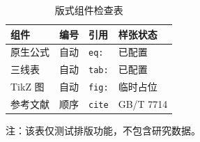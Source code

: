 \begin{table}[t]
  \centering
  \caption{版式组件检查表}
  \label{tab:sample-layout}
  \begin{threeparttable}
    \small
    \begin{tabularx}{\columnwidth}{@{}lYYY@{}}
      \toprule
      组件 & 编号 & 引用 & 样张状态 \\
      \midrule
      原生公式 & 自动 & \texttt{eq:} & 已配置 \\
      三线表 & 自动 & \texttt{tab:} & 已配置 \\
      TikZ 图 & 自动 & \texttt{fig:} & 临时占位 \\
      参考文献 & 顺序 & \texttt{cite} & GB/T 7714 \\
      \bottomrule
    \end{tabularx}
    \begin{tablenotes}[flushleft]\footnotesize
      \item 注：该表仅测试排版功能，不包含研究数据。
    \end{tablenotes}
  \end{threeparttable}
\end{table}
